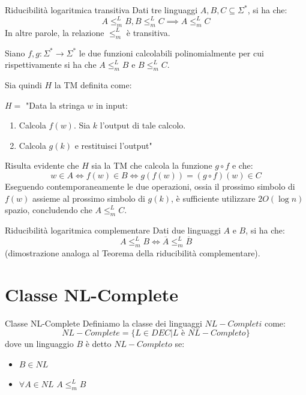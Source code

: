 \begin{Thm}{Riducibilità logaritmica transitiva}{}
Dati tre linguaggi $A, B, C\subseteq\Sigma^*$, si ha che:
\begin{equation*}
    A\leq^L_m B, B\leq^L_m C\implies A\leq^L_m C    
\end{equation*}
In altre parole, la relazione $\leq^L_m$ è transitiva.
\begin{demonstration}
Siano $f, g : \Sigma^*\to \Sigma^*$ le due funzioni calcolabili polinomialmente per cui rispettivamente si ha che $A\leq^L_m B$ e $B\leq^L_m C$.

Sia quindi $H$ la TM definita come:

$H =$ "Data la stringa $w$ in input:
\begin{enumerate}
    \item Calcola $f(w)$. Sia $k$ l’output di tale calcolo.
    \item Calcola $g(k)$ e restituisci l’output"
\end{enumerate}
Risulta evidente che $H$ sia la TM che calcola la funzione $g\circ f$ e che:
\begin{equation*}
    w\in A\iff f(w)\in B\iff g(f(w)) = (g\circ f)(w)\in C
\end{equation*}
Eseguendo contemporaneamente le due operazioni, ossia il prossimo simbolo di $f(w)$ assieme al prossimo simbolo di $g(k)$, è sufficiente utilizzare $2O(\log n)$ spazio, concludendo che $A\leq^L_m C$.
\end{demonstration}    
\end{Thm}

\begin{Thm}{Riducibilità logaritmica complementare}{}
Dati due linguaggi $A$ e $B$, si ha che:
\begin{equation*}
    A\leq^L_m B\iff \overline{A}\leq^L_m \overline{B}
\end{equation*}
(dimostrazione analoga al Teorema della riducibilità complementare).
\end{Thm}

\section{Classe NL-Complete}
\begin{Definition}{Classe NL-Complete}{}
Definiamo la classe dei linguaggi $NL-Completi$ come:
\begin{equation*}
    NL-Complete = \{L\in DEC | L\textit{ è }NL-Completo\}
\end{equation*}
dove un linguaggio $B$ è detto $NL-Completo$ se:
\begin{itemize}
    \item $B\in NL$
    \item $\forall A\in NL$ $A\leq^L_m B$
\end{itemize}
\end{Definition}

